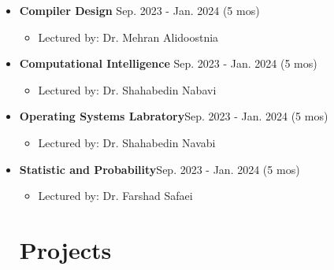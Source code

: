 \documentclass[11pt,a4paper,sans]{moderncv}        %
\begin{document}
\begin{itemize}
    \item \textbf{Compiler Design} \hfill Sep. 2023 - Jan. 2024 (5 mos)
    \begin{itemize}
        \item Lectured by: Dr. Mehran Alidoostnia
    \end{itemize}

    \item \textbf{Computational Intelligence} \hfill Sep. 2023 - Jan. 2024 (5 mos)
    \begin{itemize}
        \item Lectured by: Dr. Shahabedin Nabavi
    \end{itemize}

    \item \textbf{Operating Systems Labratory}\hfill Sep. 2023 - Jan. 2024 (5 mos)
    \begin{itemize}
        \item Lectured by: Dr. Shahabedin Navabi
    \end{itemize}

\item \textbf{Statistic and Probability}\hfill Sep. 2023 - Jan. 2024 (5 mos)
    \begin{itemize}
        \item Lectured by: Dr. Farshad Safaei

\end{itemize}



\section{Projects}


\end{itemize}
\end{document}
